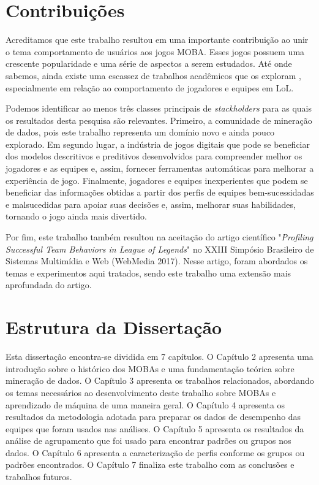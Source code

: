 \section{Contribuições}
Acreditamos que este trabalho resultou em uma importante contribuição ao unir o tema comportamento de usuários aos jogos MOBA. Esses jogos possuem uma crescente popularidade e uma série de aspectos a serem estudados. Até onde sabemos, ainda existe uma escassez de trabalhos acadêmicos que os exploram \cite{drachen2014skill} \cite{ong2015player}, especialmente em relação ao comportamento de jogadores e equipes em LoL.

Podemos identificar ao menos três classes principais de \textit{stackholders} para as quais os resultados desta pesquisa são relevantes. Primeiro, a comunidade de mineração de dados, pois este trabalho representa um domínio novo e ainda pouco explorado. Em segundo lugar, a indústria de jogos digitais que pode se beneficiar dos modelos descritivos e preditivos desenvolvidos para compreender melhor os jogadores e as equipes e, assim, fornecer ferramentas automáticas para melhorar a experiência de jogo. Finalmente, jogadores e equipes inexperientes que podem se beneficiar das informações obtidas a partir dos perfis de equipes bem-sucessidadas e malsucedidas para apoiar suas decisões e, assim, melhorar suas habilidades, tornando o jogo ainda mais divertido.

Por fim, este trabalho também resultou na aceitação do artigo científico "\textit{Profiling Successful Team Behaviors in League of Legends}" no XXIII Simpósio Brasileiro de Sistemas Multimídia e Web (WebMedia 2017). Nesse artigo, foram abordados os temas e experimentos aqui tratados, sendo este trabalho uma extensão mais aprofundada do artigo.

\section{Estrutura da Dissertação}
Esta dissertação encontra-se dividida em 7 capítulos. O Capítulo 2 apresenta uma introdução sobre o histórico dos MOBAs e uma fundamentação teórica sobre mineração de dados. O Capítulo 3 apresenta os trabalhos relacionados, abordando os temas necessários ao desenvolvimento deste trabalho sobre MOBAs e aprendizado de máquina de uma maneira geral. O Capítulo 4 apresenta os resultados da metodologia adotada para preparar os dados de desempenho das equipes que foram usados nas análises. O Capítulo 5 apresenta os resultados da análise de agrupamento que foi usado para encontrar padrões ou grupos nos dados. O Capítulo 6 apresenta a caracterização de perfis conforme os grupos ou padrões encontrados. O Capítulo 7 finaliza este trabalho com as conclusões e trabalhos futuros.

